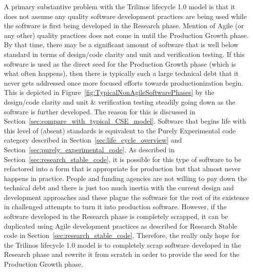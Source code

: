 \documentclass[11pt]{SANDreport}
\begin{document}
A primary substantive problem with the Trilinos lifecycle 1.0 model is
that it does not assume any quality software development practices are
being used while the software is first being developed in the Research
phase.  Mention of Agile (or any other) quality practices does not
come in until the Production Growth phase.  By that time, there may be
a significant amount of software that is well below standard in terms
of design/code clarity and unit and verification testing.  If this
software is used as the direct seed for the Production Growth phase
(which is what often happens), then there is typically such a large
technical debt that it never gets addressed once more focused efforts
towards productionization begin.  This is depicted in
Figure~\ref{fig:TypicalNonAgileSoftwarePhases} by the design/code
clarity and unit \& verification testing steadily going down as the
software is further developed.  The reason for this is discussed in
Section~\ref{sec:compare_with_typical_CSE_model}.  Software that
begins life with this level of (absent) standards is equivalent to the
Purely Experimental code category described in
Section~\ref{sec:life_cycle_overview} and
Section~\ref{sec:purely_experimental_code}.  As described in
Section~\ref{sec:research_stable_code}, it is possible for this type
of software to be refactored into a form that is appropriate for
production but that almost never happens in practice.  People and
funding agencies are not willing to pay down the technical debt and
there is just too much inertia with the current design and development
approaches and these plague the software for the rest of its existence
in challenged attempts to turn it into production software.  However,
if the software developed in the Research phase is completely
scrapped, it can be duplicated using Agile development practices as
described for Research Stable code in
Section~\ref{sec:research_stable_code}.  Therefore, the really only
hope for the Trilinos lifecycle 1.0 model is to completely scrap
software developed in the Research phase and rewrite it from scratch
in order to provide the seed for the Production Growth phase.
\end{document}
